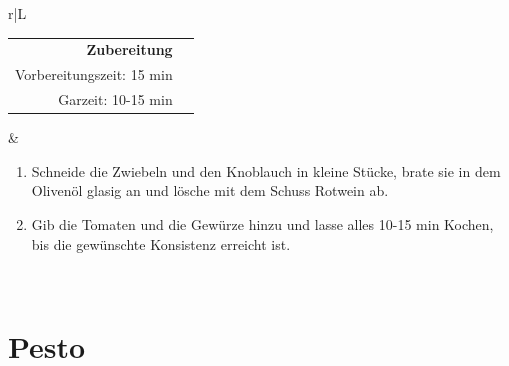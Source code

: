 \documentclass[a4paper, 12pt]{scrbook} 								%
\numberwithin{equation}{section} 									%
\begin{document}
\begin{tabularx}{\textwidth}{r|L}
		
			\begin{tabular}[t]{rr}
				\textbf{Zubereitung}	\\
				Vorbereitungszeit: 15 min	\\
				Garzeit:	10-15 min		\\
			\end{tabular}			&	\begin{enumerate}[]
											\item Schneide die Zwiebeln und den Knoblauch in kleine Stücke, brate sie in dem Olivenöl glasig an und lösche mit dem Schuss Rotwein ab.
											\item Gib die Tomaten und die Gewürze hinzu und lasse alles 10-15 min Kochen, bis die gewünschte Konsistenz erreicht ist. 
										\end{enumerate}	\\
		\end{tabularx}
		\newpage



	\section{Pesto}	\label{pesto}
\end{document}
